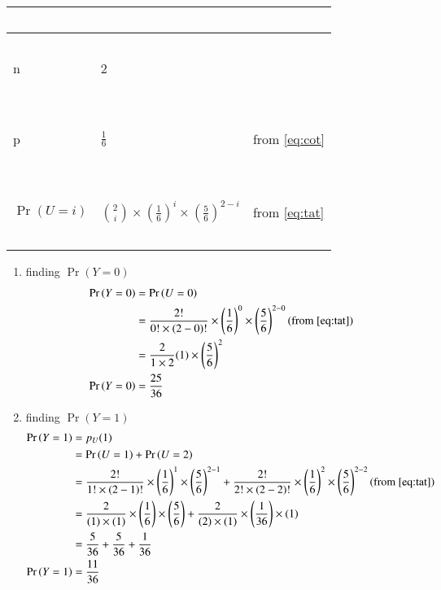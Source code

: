 \documentclass[journal,12pt,onecolumn]{IEEEtran}
\providecommand{\pr}[1]{\ensuremath{\Pr\left(#1\right)}}
\providecommand{\brak}[1]{\ensuremath{\left(#1\right)}}
\theoremstyle{remark}
\begin{document}
\begin{enumerate}
\begin{tabular}{|l|l|l|}
\ & \ & \  \\
\hline
\ &\ &\  \\
\large {n} & \large{2} &  \\
\ & \ & \  \\
\hline
\ & \ & \  \\
\large {p} & \large$\frac{1}{6}$& from \eqref{eq:cot}\\
\ & \ & \  \\
\hline
\ & \ & \  \\
$\pr{U=i}$ & \large${2 \choose i}\times \brak{\frac{1}{6}}^i\times\brak{\frac{5}{6}}^{2-i}$ & from \eqref{eq:tat}\\
\ & \ & \  \\
\hline
\end{tabular}
\begin{enumerate}
\item finding $\pr{Y=0}$
\begin{align}
\pr{Y=0}&=\pr{U=0}\\
&=\frac{2!}{0!\times(2-0)!}\times\brak{\frac{1}{6}}^0\times\brak{\frac{5}{6}}^{2-0} (\text{from } \eqref{eq:tat})\\
&=\frac{2}{1\times2}(1)\times\brak{\frac{5}{6}}^{2}\\
\pr{Y=0}&=\frac{25}{36}
\end{align}
\item finding $\pr{Y=1}$
\begin{align}
\pr{Y=1}&=p_U(1)\\
&=\pr{U=1}+\pr{U=2}\\
&=\frac{2!}{1!\times(2-1)!}\times\brak{\frac{1}{6}}^1\times\brak{\frac{5}{6}}^{2-1}+\frac{2!}{2!\times(2-2)!}\times\brak{\frac{1}{6}}^2\times\brak{\frac{5}{6}}^{2-2} (\text{from }\eqref{eq:tat})\\
&=\frac{2}{(1)\times(1)}\times\brak{\frac{1}{6}}\times\brak{\frac{5}{6}}+\frac{2}{(2)\times(1)}\times\brak{\frac{1}{36}}\times(1)  \\
&=\frac{5}{36}+\frac{5}{36}+\frac{1}{36}\\
\pr{Y=1}&=\frac{11}{36}
\end{align}
\end{enumerate}

\end{enumerate}
\end{document}
